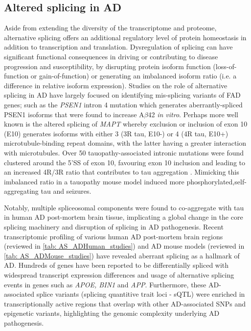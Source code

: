 \newpage
\subsection{Altered splicing in AD}\label{intro:AD_alteredsplicing}
Aside from extending the diversity of the transcriptome and proteome, alternative splicing offers an additional regulatory level of protein homeostasis in addition to transcription and translation. Dysregulation of splicing can have significant functional consequences in driving or contributing to disease progression and susceptibility, by disrupting protein isoform function (loss-of-function or gain-of-function) or generating an imbalanced isoform ratio (i.e. a difference in relative isoform expression). Studies on the role of alternative splicing in AD have largely focused on identifying mis-splicing variants of FAD genes; such as the \textit{PSEN1} intron 4 mutation which generates aberrantly-spliced PSEN1 isoforms that were found to increase A$\beta$42 \textit{in vitro}\cite{DeJonghe1999}. Perhaps more well known is the altered splicing of \textit{MAPT} whereby exclusion or inclusion of exon 10 (E10) generates isoforms with either 3 (3R tau, E10-) or 4 (4R tau, E10+) microtubule-binding repeat domains, with the latter having a greater interaction with microtubules. Over 50 tauopathy-associated intronic mutations were found clustered around the 5'SS of exon 10, favouring exon 10 inclusion \cite{DSouza1999, Ghetti2015} and leading to an increased 4R/3R ratio that contributes to tau aggregation \cite{Adams2010}. Mimicking this imbalanced ratio in a tauopathy mouse model induced more phosphorylated,self-aggregating tau and seizures\cite{Schoch2016}.  

Notably, multiple spliceosomal components were found to co-aggregate with tau in human AD post-mortem brain tissue\cite{Bai2013}, implicating a global change in the core splicing machinery and disruption of splicing in AD pathogenesis. Recent transcriptomic profiling of various human AD post-mortem brain regions (reviewed in \cref{tab: AS_ADHuman_studies}) and AD mouse models (reviewed in \cref{tab: AS_ADMouse_studies}) have revealed aberrant splicing as a hallmark of AD. Hundreds of genes have been reported to be differentially spliced with widespread transcript expression differences and usage of alternative splicing events in genes such as \textit{APOE, BIN1} and \textit{APP}\cite{Marques-Coelho2021, Raj2018}. Furthermore, these AD-associated splice variants (splicing quantitive trait loci - sQTL) were enriched in transcriptionally active regions that overlap with other AD-associated SNPs and epigenetic variants, highlighting the genomic complexity underlying AD pathogenesis.  

